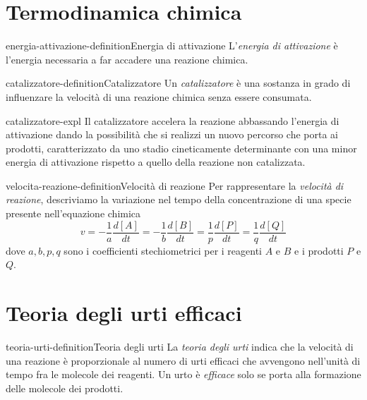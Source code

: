 \documentclass[preview]{standalone}
\begin{document}
\genpage

\section{Termodinamica chimica}

\begin{snippetdefinition}{energia-attivazione-definition}{Energia di attivazione}
    L'\textit{energia di attivazione} è l'energia necessaria
    a far accadere una reazione chimica.
\end{snippetdefinition}

\begin{snippetdefinition}{catalizzatore-definition}{Catalizzatore}
    Un \textit{catalizzatore} è
    una sostanza in grado di influenzare la
    velocità di una reazione chimica senza essere consumata.
\end{snippetdefinition}

\begin{snippet}{catalizzatore-expl}
    Il catalizzatore accelera la reazione abbassando l'energia
di attivazione dando la possibilità che si realizzi un nuovo
percorso che porta ai prodotti, caratterizzato da uno stadio
cineticamente determinante con una minor energia di
attivazione rispetto a quello della reazione non catalizzata.
\end{snippet}

\begin{snippetdefinition}{velocita-reazione-definition}{Velocità di reazione}
    Per rappresentare la \textit{velocità di reazione}, descriviamo la
    variazione nel tempo della concentrazione di una specie
    presente nell'equazione chimica
    \[
        v
        = - \frac{1}{a} \frac{d[A]}{dt}
        = - \frac{1}{b} \frac{d[B]}{dt}
        = \frac{1}{p} \frac{d[P]}{dt}
        = \frac{1}{q} \frac{d[Q]}{dt}
    \]
    dove \(a,b,p,q\) sono i coefficienti stechiometrici
    per i reagenti \(A\) e \(B\) e i prodotti \(P\) e \(Q\).
\end{snippetdefinition}

\section{Teoria degli urti efficaci}

\begin{snippetdefinition}{teoria-urti-definition}{Teoria degli urti}
    La \textit{teoria degli urti}
    indica che 
    la velocità di una reazione è
    proporzionale al numero di urti efficaci che avvengono
    nell'unità di tempo fra le molecole dei reagenti.
    Un urto è \textit{efficace} solo se porta alla formazione delle
    molecole dei prodotti.
\end{snippetdefinition}
\end{document}
